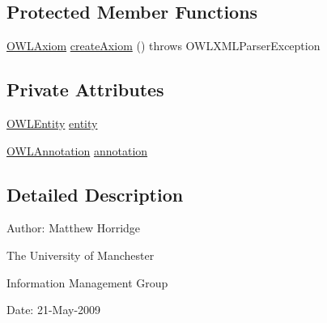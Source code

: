 \subsection*{Protected Member Functions}
\begin{DoxyCompactItemize}
\item 
\hyperlink{interfaceorg_1_1semanticweb_1_1owlapi_1_1model_1_1_o_w_l_axiom}{O\-W\-L\-Axiom} \hyperlink{classorg_1_1coode_1_1owlapi_1_1owlxmlparser_1_1_legacy_entity_annotation_element_handler_aa9e49239e3184d11575cee0d0f865826}{create\-Axiom} ()  throws O\-W\-L\-X\-M\-L\-Parser\-Exception 
\end{DoxyCompactItemize}
\subsection*{Private Attributes}
\begin{DoxyCompactItemize}
\item 
\hyperlink{interfaceorg_1_1semanticweb_1_1owlapi_1_1model_1_1_o_w_l_entity}{O\-W\-L\-Entity} \hyperlink{classorg_1_1coode_1_1owlapi_1_1owlxmlparser_1_1_legacy_entity_annotation_element_handler_a9c7a7b6518ca448563afc2cb52d01a92}{entity}
\item 
\hyperlink{interfaceorg_1_1semanticweb_1_1owlapi_1_1model_1_1_o_w_l_annotation}{O\-W\-L\-Annotation} \hyperlink{classorg_1_1coode_1_1owlapi_1_1owlxmlparser_1_1_legacy_entity_annotation_element_handler_aa1477f4432cc3038e2b9fdd5a632e738}{annotation}
\end{DoxyCompactItemize}


\subsection{Detailed Description}
Author\-: Matthew Horridge\par
 The University of Manchester\par
 Information Management Group\par
 Date\-: 21-\/\-May-\/2009 


